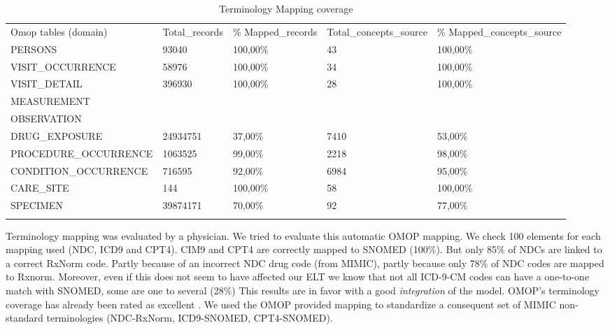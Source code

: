 
\begin{table*}[t]
\caption{Terminology Mapping coverage}
\begin{tabular}{@{}lllll@{}}\toprule
Omop tables (domain)   & Total\_records & \% Mapped\_records  & Total\_concepts\_source & \% Mapped\_concepts\_source  \\\colrule
PERSONS                & 93040          & 100,00\%            & 43                      & 100,00\%                     \\
VISIT\_OCCURRENCE      & 58976          & 100,00\%            & 34                      & 100,00\%                     \\
VISIT\_DETAIL          & 396930         & 100,00\%            & 28                      & 100,00\%                     \\
MEASUREMENT            &                &                     &                         &                              \\
OBSERVATION            &                &                     &                         &                              \\
DRUG\_EXPOSURE         & 24934751       & 37,00\%             & 7410                    & 53,00\%                      \\
PROCEDURE\_OCCURRENCE  & 1063525        & 99,00\%             & 2218                    & 98,00\%                      \\
CONDITION\_OCCURRENCE  & 716595         & 92,00\%             & 6984                    & 95,00\%                      \\
CARE\_SITE             & 144            & 100,00\%            & 58                      & 100,00\%                     \\
SPECIMEN               & 39874171       & 70,00\%             & 92                      & 77,00\%                      \\\botrule
\end{tabular}
\label{table:mapping}
\end{table*}

Terminology mapping was evaluated by a physician. 
We tried to evaluate this automatic OMOP mapping. We check 100 elements for each 
mapping used (NDC, ICD9 and CPT4). CIM9 and CPT4 are correctly mapped to SNOMED 
(100\%). But only 85\% of NDCs are linked to a correct RxNorm code. 
Partly because of an incorrect NDC drug code (from MIMIC), partly because only 78\% 
of NDC codes are mapped to Rxnorm. Moreover, even if this does not seem to have 
affected our ELT we know that not all ICD-9-CM codes can have a one-to-one match 
with SNOMED, some are one to several (28\%) \cite{snomed-icd9}
This results are in favor with a good \textit{integration} of the model.
OMOP's terminology coverage has already been rated as excellent
\cite{omop-vs-pcornet}. We used the OMOP provided mapping to standardize a
consequent set of MIMIC non-standard terminologies (NDC-RxNorm, ICD9-SNOMED,
CPT4-SNOMED). 

